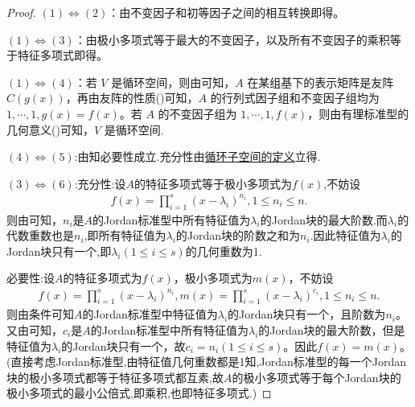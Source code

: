 \documentclass[../../main.tex]{subfiles}%
\begin{document}
\begin{proof}

\((1)\Leftrightarrow(2)\)：由不变因子和初等因子之间的相互转换即得。

\((1)\Leftrightarrow(3)\)：由极小多项式等于最大的不变因子，以及所有不变因子的乘积等于特征多项式即得。 

\((1)\Leftrightarrow(4)\)：若 \(V\) 是循环空间，则由可知，\(A\) 在某组基下的表示矩阵是友阵 \(C(g(x))\)，再由友阵的性质()可知，\(A\) 的行列式因子组和不变因子组均为 \(1,\cdots,1,g(x)=f(x)\)。若 \(A\) 的不变因子组为 \(1,\cdots,1,f(x)\)，则由有理标准型的几何意义()可知，\(V\) 是循环空间.

\((4)\Leftrightarrow(5)\):由知必要性成立.充分性由\hyperref[definition:循环子空间和循环空间]{循环子空间的定义}立得.

\((3)\Leftrightarrow(6)\):{\heiti 充分性:}设$A$的特征多项式等于极小多项式为$f\left( x \right)$,不妨设
\begin{align*}
f\left( x \right) =\prod_{i=1}^s{\left( x-\lambda _i \right) ^{n_i}},1\leqslant n_i\leqslant n.
\end{align*}
则由可知，$n_i$是$A$的Jordan标准型中所有特征值为$\lambda _i$的Jordan块的最大阶数.而$\lambda_i$的代数重数也是$n_i$,即所有特征值为$\lambda_i$的Jordan块的阶数之和为$n_i$.因此特征值为$\lambda_i$的Jordan块只有一个,即$\lambda_i(1\leqslant i\leqslant s)$的几何重数为1.

{\heiti 必要性:}设$A$的特征多项式为$f\left( x \right)$，极小多项式为$m\left( x \right)$，不妨设
\begin{align*}
f\left( x \right) =\prod_{i=1}^s{\left( x-\lambda _i \right) ^{n_i}},m\left( x \right) =\prod_{i=1}^s{\left( x-\lambda _i \right) ^{c_i}},1\leqslant n_i\leqslant n.
\end{align*}
则由条件可知$A$的Jordan标准型中特征值为$\lambda _i$的Jordan块只有一个，且阶数为$n_i$。又由可知，$c_i$是$A$的Jordan标准型中所有特征值为$\lambda _i$的Jordan块的最大阶数，但是特征值为$\lambda _i$的Jordan块只有一个，故$c_i=n_i\left( 1\leqslant i\leqslant s \right)$。因此$f\left( x \right) =m\left( x \right)$。(直接考虑Jordan标准型,由特征值几何重数都是1知,Jordan标准型的每一个Jordan块的极小多项式都等于特征多项式都互素,故$A$的极小多项式等于每个Jordan块的极小多项式的最小公倍式,即乘积,也即特征多项式.)


\end{proof}
\end{document}
